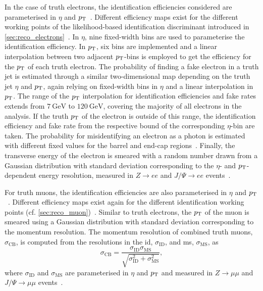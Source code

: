 In the case of truth electrons, the identification efficiencies considered are parameterised in $\eta$ and $p_{\mathrm{T}}$~\cite{PERF-2017-01}. Different efficiency maps exist for the different working points of the likelihood-based identification discriminant introduced in \cref{sec:reco_electrons}~\cite{PERF-2017-01}.
In $\eta$, nine fixed-width bins are used to parameterise the identification efficiency. In $p_{\mathrm{T}}$, six bins are implemented and a linear interpolation between two adjacent $p_{\mathrm{T}}$-bins is employed to get the efficiency for the  $p_{\mathrm{T}}$ of each truth electron.
The probability of finding a fake electron in a truth jet is estimated through a similar two-dimensional map depending on the truth jet $\eta$ and $p_{\mathrm{T}}$, again relying on fixed-width bins in $\eta$ and a linear interpolation in $p_{\mathrm{T}}$. %
The range of the $p_{\mathrm{T}}$ interpolation for identification efficiencies and fake rates extends from $\SI{7}{\GeV}$ to $\SI{120}{\GeV}$, covering the majority of all electrons in the analysis.
If the truth $p_{\mathrm{T}}$ of the electron is outside of this range, the identification efficiency and fake rate from the respective bound of the corresponding $\eta$-bin are taken.
The probability for misidentifying an electron as a photon is estimated with different fixed values for the barrel and end-cap regions~\cite{PERF-2017-02}.
Finally, the transverse energy of the electron is smeared with a random number drawn from a Gaussian distribution with standard deviation corresponding to the $\eta$- and $p_{\mathrm{T}}$-dependent energy resolution, measured in $Z\to ee$ and $J/\Psi\to ee$ events~\cite{PERF-2017-03}.

For truth muons, the identification efficiencies are also parameterised in $\eta$ and $p_{\mathrm{T}}$~\cite{Aad:2020gmm}. Different efficiency maps exist again for the different identification working points (cf. \cref{sec:reco_muon})~\cite{Aad:2020gmm}. Similar to truth electrons, the  $p_{\mathrm{T}}$ of the muon is smeared using a Gaussian distribution with standard deviation corresponding to the momentum resolution. The momentum resolution of combined truth muons, $\sigma_\mathrm{CB}$, is computed from the resolutions in the \gls{id}, $\sigma_\mathrm{ID}$, and \gls{ms}, $\sigma_\mathrm{MS}$, as
\begin{equation}
	\sigma_\mathrm{CB} = \frac{\sigma_\mathrm{ID}\sigma_\mathrm{MS}}{\sqrt{\sigma_\mathrm{ID}^2 + \sigma_\mathrm{MS}^2}},
\end{equation}
where $\sigma_\mathrm{ID}$ and $\sigma_\mathrm{MS}$ are parameterised in $\eta$ and $p_{\mathrm{T}}$ and measured in $Z\to \mu\mu$ and $J/\Psi\to \mu\mu$ events~\cite{PERF-2015-10}.

